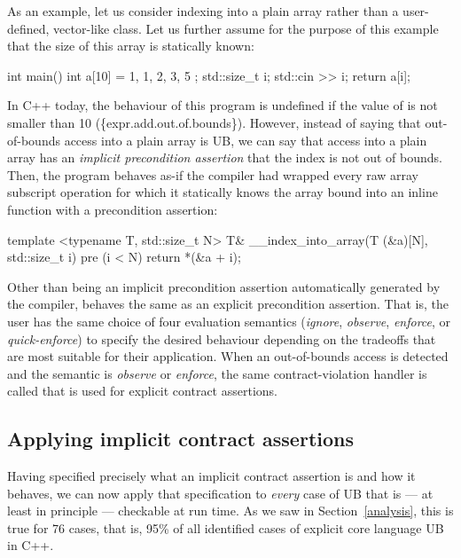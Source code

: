 {As an example, let us consider indexing into a plain array rather than a user-defined, vector-like class. Let us further assume for the purpose of this example that the size  of this array is statically known:

\begin{codeblock}
int main() {
  int a[10] = { 1, 1, 2, 3, 5 };
  std::size_t i; 
  std::cin >> i;
  return a[i];
}
\end{codeblock}

In C++ today, the behaviour of this program is undefined if the value of  is not smaller than 10 (\{expr.add.out.of.bounds\}). However, instead of saying that out-of-bounds access into a plain array is UB, we can say that access into a plain array has an \emph{implicit precondition assertion} that the index is not out of bounds. Then, the program behaves as-if the compiler had wrapped every raw array subscript operation for which it statically knows the array bound  into an inline function with a precondition assertion:

\begin{codeblock}
template <typename T, std::size_t N>
T& __index_into_array(T (&a)[N], std::size_t i) 
pre (i < N) {
  return *(&a + i);
}
\end{codeblock}

Other than being an implicit precondition assertion automatically generated by the compiler, \mbox{} behaves the same as an explicit precondition assertion. That is, the user has the same choice of four evaluation semantics (\emph{ignore}, \emph{observe}, \emph{enforce}, or \emph{quick-enforce}) to specify the desired behaviour depending on the tradeoffs that are most suitable for their application. When an out-of-bounds access is detected and the semantic is \emph{observe} or \emph{enforce}, the same contract-violation handler is called that is used for explicit contract assertions.

\subsection{Applying implicit contract assertions}
\label{applyicas}

Having specified precisely what an implicit contract assertion is and how it behaves, we can now apply that specification to \emph{every} case of UB  that is --- at least in principle --- checkable at run time. As we saw in Section~\ref{analysis}, this is true for 76 cases, that is, 95\% of all identified cases of explicit core language UB in C++.

}
